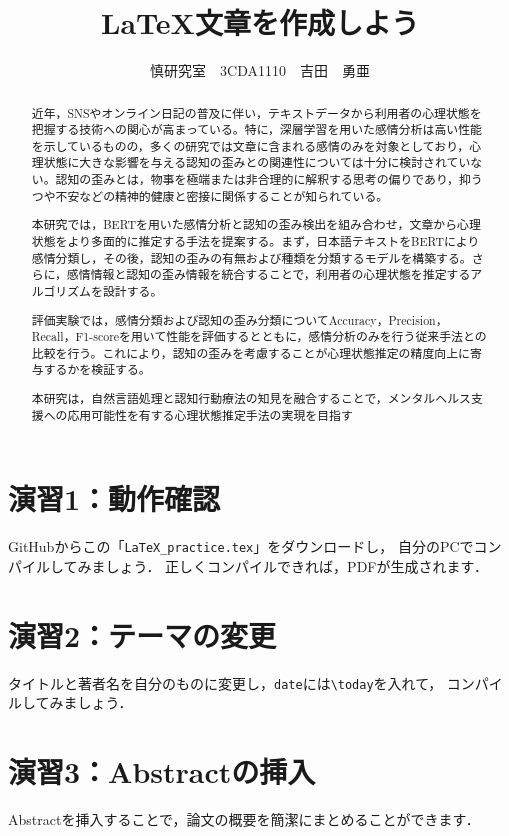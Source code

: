\documentclass[a4paper,twocolumn]{jsarticle}
\title{%
LaTeX文章を作成しよう
}
\author{慎研究室　3CDA1110　吉田　勇亜}
\date{}
\begin{document}
\maketitle

\begin{abstract}
近年，SNSやオンライン日記の普及に伴い，テキストデータから利用者の心理状態を把握する技術への関心が高まっている。特に，深層学習を用いた感情分析は高い性能を示しているものの，多くの研究では文章に含まれる感情のみを対象としており，心理状態に大きな影響を与える認知の歪みとの関連性については十分に検討されていない。認知の歪みとは，物事を極端または非合理的に解釈する思考の偏りであり，抑うつや不安などの精神的健康と密接に関係することが知られている。

本研究では，BERTを用いた感情分析と認知の歪み検出を組み合わせ，文章から心理状態をより多面的に推定する手法を提案する。まず，日本語テキストをBERTにより感情分類し，その後，認知の歪みの有無および種類を分類するモデルを構築する。さらに，感情情報と認知の歪み情報を統合することで，利用者の心理状態を推定するアルゴリズムを設計する。

評価実験では，感情分類および認知の歪み分類についてAccuracy，Precision，Recall，F1-scoreを用いて性能を評価するとともに，感情分析のみを行う従来手法との比較を行う。これにより，認知の歪みを考慮することが心理状態推定の精度向上に寄与するかを検証する。

本研究は，自然言語処理と認知行動療法の知見を融合することで，メンタルヘルス支援への応用可能性を有する心理状態推定手法の実現を目指す
\end{abstract}

\section*{演習1：動作確認}
GitHubからこの「\texttt{LaTeX\_practice.tex}」をダウンロードし，
自分のPCでコンパイルしてみましょう．
正しくコンパイルできれば，PDFが生成されます．

\section*{演習2：テーマの変更}
タイトルと著者名を自分のものに変更し，\texttt{date}には\verb|\today|を入れて，
コンパイルしてみましょう．

\section*{演習3：Abstractの挿入}
Abstractを挿入することで，論文の概要を簡潔にまとめることができます．
\end{document}
